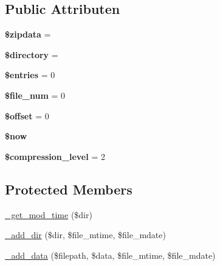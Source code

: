 \subsection*{Public Attributen}
\begin{DoxyCompactItemize}
\item 
\mbox{\label{class_c_i___zip_a395accfd5884d9a0e6fd53470b3e85b1}} 
{\bfseries \$zipdata} = \textquotesingle{}\textquotesingle{}
\item 
\mbox{\label{class_c_i___zip_a1b07c630eb02f770a082a013373a16d6}} 
{\bfseries \$directory} = \textquotesingle{}\textquotesingle{}
\item 
\mbox{\label{class_c_i___zip_affb4200921149b6126d0e51b415b2c75}} 
{\bfseries \$entries} = 0
\item 
\mbox{\label{class_c_i___zip_af1ab53ee1a849492829ce782aac0163d}} 
{\bfseries \$file\+\_\+num} = 0
\item 
\mbox{\label{class_c_i___zip_aec4de82415d7f05cb9748d12d3a95a87}} 
{\bfseries \$offset} = 0
\item 
\mbox{\label{class_c_i___zip_af1d5ccdee975b8f4d20aaffc5b28557c}} 
{\bfseries \$now}
\item 
\mbox{\label{class_c_i___zip_a9a4e30766e452f0d2feaecd666787ca1}} 
{\bfseries \$compression\+\_\+level} = 2
\end{DoxyCompactItemize}
\subsection*{Protected Members}
\begin{DoxyCompactItemize}
\item 
\mbox{\hyperlink{class_c_i___zip_a2e4a669b246619934060ea323b99b332}{\+\_\+get\+\_\+mod\+\_\+time}} (\$dir)
\item 
\mbox{\hyperlink{class_c_i___zip_aacd1bc7175638298e01bd6c16bccfbe6}{\+\_\+add\+\_\+dir}} (\$dir, \$file\+\_\+mtime, \$file\+\_\+mdate)
\item 
\mbox{\hyperlink{class_c_i___zip_a4ff8a5ea57979ec1a44cc9e443acf26d}{\+\_\+add\+\_\+data}} (\$filepath, \$data, \$file\+\_\+mtime, \$file\+\_\+mdate)
\end{DoxyCompactItemize}
